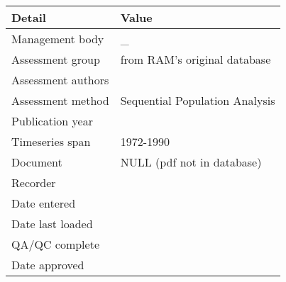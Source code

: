 \begin{table}[htb]
\centering
\begin{tabular}{lp{7cm}}
\toprule
Detail & Value \\
\midrule
Management body    & \_                             \\
Assessment group   & from RAM's original database   \\
Assessment authors &                                \\
Assessment method  & Sequential Population Analysis \\
Publication year   &                                \\
Timeseries span    & 1972-1990                      \\
Document           & NULL (pdf not in database)     \\
Recorder           &                                \\
Date entered       &                                \\
Date last loaded   &                                \\
QA/QC complete     &                                \\
Date approved      &                                \\
\bottomrule
\end{tabular}
\label{tab:assessdet}
\end{table}
